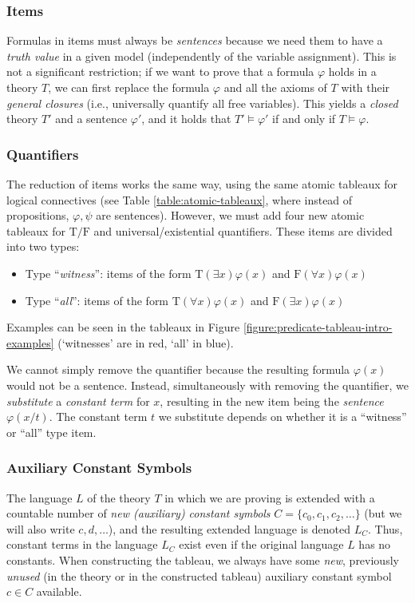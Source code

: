 \subsubsection{Items}
Formulas in items must always be \emph{sentences} because we need them to have a \emph{truth value} in a given model (independently of the variable assignment). This is not a significant restriction; if we want to prove that a formula $\varphi$ holds in a theory $T$, we can first replace the formula $\varphi$ and all the axioms of $T$ with their \emph{general closures} (i.e., universally quantify all free variables). This yields a \emph{closed} theory $T'$ and a sentence $\varphi'$, and it holds that $T'\models\varphi'$ if and only if $T\models\varphi$.

\subsubsection{Quantifiers}
The reduction of items works the same way, using the same atomic tableaux for logical connectives (see Table \ref{table:atomic-tableaux}, where instead of propositions, $\varphi,\psi$ are sentences). However, we must add four new atomic tableaux for $\mathrm T/\mathrm F$ and universal/existential quantifiers. These items are divided into two types:
\begin{itemize}
    \item Type ``\emph{witness}'': items of the form $\mathrm{T}(\exists x)\varphi(x)$ and $\mathrm{F}(\forall x)\varphi(x)$
    \item Type ``\emph{all}'': items of the form $\mathrm{T}(\forall x)\varphi(x)$ and $\mathrm{F}(\exists x)\varphi(x)$    
\end{itemize}
Examples can be seen in the tableaux in Figure \ref{figure:predicate-tableau-intro-examples} (`witnesses' are in red, `all' in blue).

We cannot simply remove the quantifier because the resulting formula $\varphi(x)$ would not be a sentence. Instead, simultaneously with removing the quantifier, we \emph{substitute} a \emph{constant term} for $x$, resulting in the new item being the \emph{sentence} $\varphi(x/t)$. The constant term $t$ we substitute depends on whether it is a ``witness'' or ``all'' type item.

\subsubsection{Auxiliary Constant Symbols}
The language $L$ of the theory $T$ in which we are proving is extended with a countable number of \emph{new (auxiliary) constant symbols} $C=\{c_0,c_1,c_2,\dots\}$ (but we will also write $c,d,\dots$), and the resulting extended language is denoted $L_C$. Thus, constant terms in the language $L_C$ exist even if the original language $L$ has no constants. When constructing the tableau, we always have some \emph{new}, previously \emph{unused} (in the theory or in the constructed tableau) auxiliary constant symbol $c\in C$ available.


